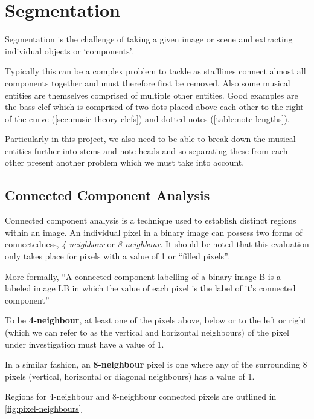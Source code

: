 \section{Segmentation}

Segmentation is the challenge of taking a given image or scene and extracting individual objects or `components'.

Typically this can be a complex problem to tackle as stafflines connect almost all components together and must therefore first be removed. Also some musical entities are themselves comprised of multiple other entities. Good examples are the bass clef which is comprised of two dots placed above each other to the right of the curve (\cref{sec:music-theory-clefs}) and dotted notes (\cref{table:note-lengths}).

Particularly in this project, we also need to be able to break down the musical entities further into stems and note heads and so separating these from each other present another problem which we must take into account.

\subsection{Connected Component Analysis}

Connected component analysis is a technique used to establish distinct regions within an image. An individual pixel in a binary image can possess two forms of connectedness, \emph{4-neighbour} or \emph{8-neighbour}. It should be noted that this evaluation only takes place for pixels with a value of 1 or ``filled pixels''.

More formally, ``A connected component labelling of a binary image B is a labeled image LB in which the value of each pixel is the label of it's connected component'' \parencite[pg 69]{shapiro2001computer}

To be \textbf{4-neighbour}, at least one of the pixels above, below or to the left or right (which we can refer to as the vertical and horizontal neighbours) of the pixel under investigation must have a value of 1.

In a similar fashion, an \textbf{8-neighbour} pixel is one where any of the surrounding 8 pixels (vertical, horizontal or diagonal neighbours) has a value of 1.

Regions for 4-neighbour and 8-neighbour connected pixels are outlined in \cref{fig:pixel-neighbours}


